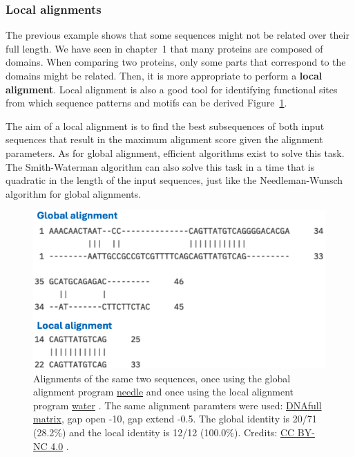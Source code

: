 \subsubsection{Local alignments}

The previous example shows that some sequences might not be related over their full length.
We have seen in chapter~1 that many proteins are composed of domains.
When comparing two proteins, only some parts that correspond to the domains might be related.
Then, it is more appropriate to perform a \textbf{local alignment}.
Local alignment is also a good tool for identifying functional sites from which sequence patterns and motifs can be derived Figure~\ref{alg_local}.

The aim of a local alignment is to find the best subsequences of both input sequences that result in the maximum alignment score given the alignment parameters.
As for global alignment, efficient algorithms exist to solve this task.
The Smith-Waterman algorithm can also solve this task in a time that is quadratic in the length of the input sequences, just like the Needleman-Wunsch algorithm for global alignments.

\begin{figure}[!htbp]
\centering
\includegraphics[width=1\linewidth]{files/alg_local-4f60831aa4af06a36d5d4c5a4124517f.png}
\caption[]{Alignments of the same two sequences, once using the global alignment program \href{https://www.ebi.ac.uk/jdispatcher/psa/emboss\_needle}{needle} and once using the local alignment program \href{https://www.ebi.ac.uk/jdispatcher/psa/emboss\_water}{water} \cite{EMBL_tools_2022}.
The same alignment paramters were used: \href{https://rosalind.info/glossary/dnafull/}{DNAfull matrix}, gap open -10, gap extend -0.5.
The global identity is 20/71 (28.2\%) and the local identity is 12/12 (100.0\%).
Credits: \href{https://creativecommons.org/licenses/by-nc/4.0/}{CC BY-NC 4.0} \cite{own_2_2024}.}
\label{alg_local}
\end{figure}


